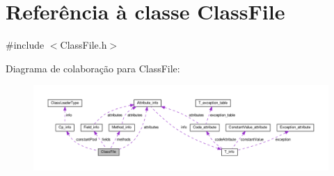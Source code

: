 \hypertarget{classClassFile}{}\section{Referência à classe Class\+File}
\label{classClassFile}


{\ttfamily \#include $<$Class\+File.\+h$>$}



Diagrama de colaboração para Class\+File\+:
\nopagebreak
\begin{figure}[H]
\begin{center}
\leavevmode
\includegraphics[width=350pt]{classClassFile__coll__graph}
\end{center}
\end{figure}
